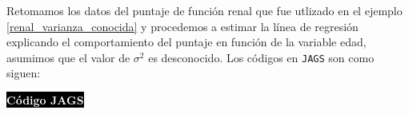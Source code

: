 \begin{Eje}
Retomamos los datos del puntaje de función renal que fue utlizado en el ejemplo \ref{renal_varianza_conocida} y procedemos a estimar la línea de regresión explicando el comportamiento del puntaje en función de la variable edad, asumimos que el valor de $\sigma^2$ es desconocido. Los códigos en \verb'JAGS' son como siguen:

\colorbox{black}{\textcolor{white}{\textbf{Código JAGS}}}
\begin{knitrout}
\color{fgcolor}\begin{kframe}
\begin{alltt}
 \hlkwb{<-} \hlstd{()\{}
     \hlopt{:}
  \hlstd{\{}
     \hlopt{~} 
     \hlkwb{<-}  \hlopt{+} \hlopt{*}
  \hlstd{\}}
   \hlopt{~} \hlstd{(}\hlstd{,} \hlstd{)}
   \hlopt{~} \hlstd{(}\hlstd{,} \hlstd{)}
   \hlopt{~} \hlstd{(}\hlstd{,} \hlstd{)}
   \hlkwb{<-} \hlopt{/}
\hlstd{\}}

 \hlkwb{<-} \hlstd{kidneydata[,}\hlstd{]}
 \hlkwb{<-} \hlstd{kidneydata[,}\hlstd{]}
 \hlkwb{<-} 

 \hlkwb{<-} \hlstd{(}\hlstd{,} \hlstd{,} \hlstd{)}
 \hlkwb{<-} \hlstd{(}\hlstd{,} \hlstd{,} \hlstd{)}
 \hlkwb{<-} \hlstd{()\{}
  \hlstd{(}\hlstd{=}\hlstd{(}\hlstd{),} \hlstd{=}\hlstd{(}\hlstd{),} \hlstd{=}\hlstd{(}\hlstd{))}
\hlstd{\}}


\end{alltt}
\end{kframe}
\end{knitrout}
\end{Eje}
